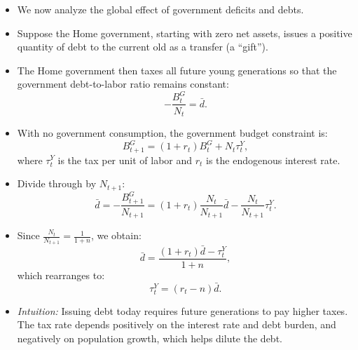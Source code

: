 \documentclass[12pt]{article}
\begin{document}
\begin{itemize}
  \item We now analyze the global effect of government deficits and debts.

  \item Suppose the Home government, starting with zero net assets, issues a positive quantity of debt to the current old as a transfer (a “gift”).

  \item The Home government then taxes all future young generations so that the government debt-to-labor ratio remains constant:
  \[
  -\frac{B_t^G}{N_t} = \bar{d}.
  \]

  \item With no government consumption, the government budget constraint is:
  \[
  B_{t+1}^G = (1+r_t)B_t^G + N_t \tau_t^Y,
  \]
  where $\tau_t^Y$ is the tax per unit of labor and $r_t$ is the endogenous interest rate.

  \item Divide through by $N_{t+1}$:
  \[
  \bar{d} = -\frac{B_{t+1}^G}{N_{t+1}} = (1+r_t)\frac{N_t}{N_{t+1}}\bar{d} - \frac{N_t}{N_{t+1}}\tau_t^Y.
  \]

  \item Since $\tfrac{N_t}{N_{t+1}} = \tfrac{1}{1+n}$, we obtain:
  \[
  \bar{d} = \frac{(1+r_t)\bar{d} - \tau_t^Y}{1+n},
  \]
  which rearranges to:
  \[
  \tau_t^Y = (r_t - n)\bar{d}. \tag{37}
  \]

  \item \textit{Intuition:} Issuing debt today requires future generations to pay higher taxes. The tax rate depends positively on the interest rate and debt burden, and negatively on population growth, which helps dilute the debt.
\end{itemize}
\end{document}
